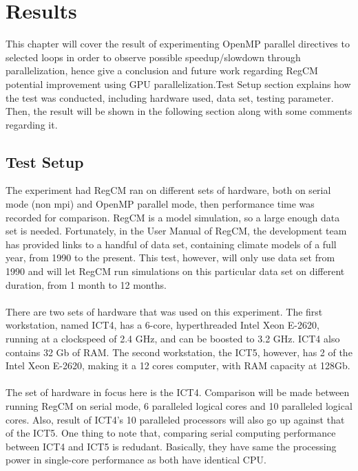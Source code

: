 \chapter{Results}

This chapter will cover the result of experimenting OpenMP parallel directives to selected loops in order to observe possible speedup/slowdown through parallelization, hence give a conclusion and future work regarding RegCM potential improvement using GPU parallelization.Test Setup section explains how the test was conducted, including hardware used, data set, testing parameter. Then, the result will be shown in the following section along with some comments regarding it. \\

\section{Test Setup}

The experiment had RegCM ran on different sets of hardware, both on serial mode (non mpi) and OpenMP parallel mode, then performance time was recorded for comparison. RegCM is a model simulation, so a large enough data set is needed. Fortunately, in the User Manual of RegCM, the development team has provided links to a handful of data set, containing climate models of a full year, from 1990 to the present. This test, however, will only use data set from 1990 and will let RegCM run simulations on this particular data set on different duration, from 1 month to 12 months. \\
~\\
There are two sets of hardware that was used on this experiment. The first workstation, named ICT4, has a 6-core, hyperthreaded Intel Xeon E-2620, running at a clockspeed of 2.4 GHz, and can be boosted to 3.2 GHz. ICT4 also contains 32 Gb of RAM. The second workstation, the ICT5, however, has 2 of the Intel Xeon E-2620, making it a 12 cores computer, with RAM capacity at 128Gb. \\
~\\
The set of hardware in focus here is the ICT4. Comparison will be made between running RegCM on serial mode, 6 paralleled logical cores and 10 paralleled logical cores. Also, result of ICT4's 10 paralleled processors will also go up against that of the ICT5. One thing to note that, comparing serial computing performance between ICT4 and ICT5 is redudant. Basically, they have same the processing power in single-core performance as both have identical CPU. \\

